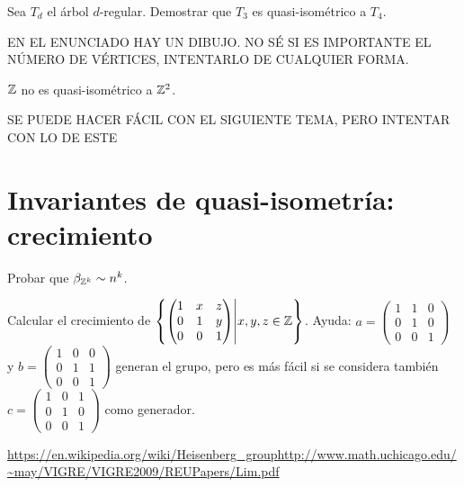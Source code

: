 \documentclass[twoside]{article}
\begin{document}
\newpage

\begin{ejercicio}{1.4}
Sea $T_d$ el árbol $d$-regular. Demostrar que $T_3$ es quasi-isométrico a $T_4$.
\end{ejercicio}
\begin{solucion}
EN EL ENUNCIADO HAY UN DIBUJO. NO SÉ SI ES IMPORTANTE EL NÚMERO DE VÉRTICES, INTENTARLO DE CUALQUIER FORMA. 
\end{solucion}

\newpage

\begin{ejercicio}{1.5}
$\mathbb{Z}$ no es quasi-isométrico a $\mathbb{Z}^2$.
\end{ejercicio}
\begin{solucion}
SE PUEDE HACER FÁCIL CON EL SIGUIENTE TEMA, PERO INTENTAR CON LO DE ESTE
\end{solucion}

\newpage

\section{Invariantes de quasi-isometría: crecimiento}

\begin{ejercicio}{2.1}
Probar que $\beta_{\mathbb{Z}^k}\sim n^k$.
\end{ejercicio}
\begin{solucion}

\end{solucion}

\newpage

\begin{ejercicio}{2.2}
Calcular el crecimiento de $\left\{\begin{pmatrix}
1 & x & z\\
0 & 1 & y\\
0 & 0 & 1
\end{pmatrix}\middle\vert x,y,z\in\mathbb{Z}\right\}$. Ayuda: $a=\begin{pmatrix}
1 & 1 & 0\\
0 & 1 & 0\\
0 & 0 & 1
\end{pmatrix}$ y $b=\begin{pmatrix}
1 & 0 & 0\\
0 & 1 & 1\\
0 & 0 & 1
\end{pmatrix}$ generan el grupo, pero es más fácil si se considera también $c=\begin{pmatrix}
1 & 0 & 1\\
0 & 1 & 0\\
0 & 0 & 1
\end{pmatrix}$ como generador. 
\end{ejercicio}
\begin{solucion}
\url{https://en.wikipedia.org/wiki/Heisenberg_group}\url{http://www.math.uchicago.edu/~may/VIGRE/VIGRE2009/REUPapers/Lim.pdf}
\end{solucion}
\end{document}
